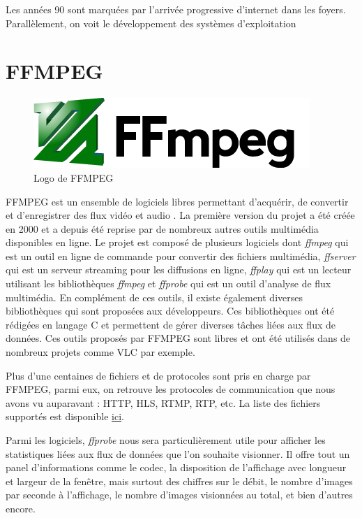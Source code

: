 \documentclass{polytech/polytech}
\begin{document}
Les années 90 sont marquées par l'arrivée progressive d'internet dans les foyers. Parallèlement, on voit le développement des systèmes d'exploitation 

\section{FFMPEG}

\begin{figure}
	\includegraphics[scale=0.5]{images/ffmpeg}
	\caption{Logo de FFMPEG}
	\label{fig:logoffmpeg}
\end{figure}

FFMPEG est un ensemble de logiciels libres permettant d’acquérir, de convertir et d’enregistrer des flux vidéo et audio \cite{_ffmpeg_2017}. La première version du projet a été créée en 2000 et a depuis été reprise par de nombreux autres outils multimédia disponibles en ligne. Le projet est composé de plusieurs logiciels dont \textit{ffmpeg} qui est un outil en ligne de commande pour convertir des fichiers multimédia, \textit{ffserver} qui est un serveur streaming pour les diffusions en ligne, \textit{ffplay} qui est un lecteur utilisant les bibliothèques \textit{ffmpeg} et \textit{ffprobe} qui est un outil d’analyse de flux multimédia. En complément de ces outils, il existe également diverses bibliothèques qui sont proposées aux développeurs. Ces bibliothèques ont été rédigées en langage C et permettent de gérer diverses tâches liées aux flux de données. Ces outils proposés par FFMPEG sont libres et ont été utilisés dans de nombreux projets comme VLC par exemple.

Plus d’une centaines de fichiers et de protocoles sont pris en charge par FFMPEG, parmi eux, on retrouve les protocoles de communication que nous avons vu auparavant : HTTP, HLS, RTMP, RTP, etc. La liste des fichiers supportés est disponible \href{http://ffmpeg.org/general.html#Supported-File-Formats_002c-Codecs-or-Features}{ici}.

Parmi les logiciels, \textit{ffprobe} nous sera particulièrement utile pour afficher les statistiques liées aux flux de données que l’on souhaite visionner. Il offre tout un panel d’informations comme le codec, la disposition de l’affichage avec longueur et largeur de la fenêtre, mais surtout des chiffres sur le débit, le nombre d’images par seconde à l’affichage, le nombre d’images visionnées au total, et bien d’autres encore.
\end{document}
